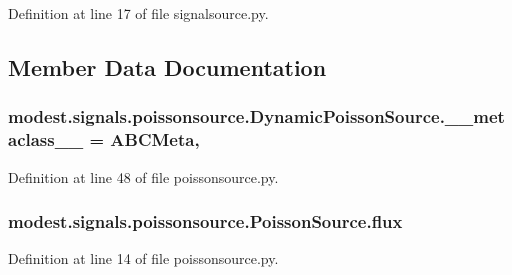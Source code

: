 Definition at line 17 of file signalsource.\+py.



\subsection{Member Data Documentation}
\subsubsection[{\texorpdfstring{\+\_\+\+\_\+metaclass\+\_\+\+\_\+}{__metaclass__}}]{\setlength{\rightskip}{0pt plus 5cm}modest.\+signals.\+poissonsource.\+Dynamic\+Poisson\+Source.\+\_\+\+\_\+metaclass\+\_\+\+\_\+ = A\+B\+C\+Meta\hspace{0.3cm}{\ttfamily [static]}, {\ttfamily [private]}}\hypertarget{classmodest_1_1signals_1_1poissonsource_1_1DynamicPoissonSource_aa41498abaa3f69680ada7902aba5890f}{}\label{classmodest_1_1signals_1_1poissonsource_1_1DynamicPoissonSource_aa41498abaa3f69680ada7902aba5890f}


Definition at line 48 of file poissonsource.\+py.

\subsubsection[{\texorpdfstring{flux}{flux}}]{\setlength{\rightskip}{0pt plus 5cm}modest.\+signals.\+poissonsource.\+Poisson\+Source.\+flux\hspace{0.3cm}{\ttfamily [inherited]}}\hypertarget{classmodest_1_1signals_1_1poissonsource_1_1PoissonSource_a6f2c657ad936b921715d826ac74f7fe5}{}\label{classmodest_1_1signals_1_1poissonsource_1_1PoissonSource_a6f2c657ad936b921715d826ac74f7fe5}


Definition at line 14 of file poissonsource.\+py.

